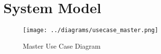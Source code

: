 \clearpage
\section{System Model}

\begin{figure}[H]
    \texttt{[image: ../diagrams/usecase\_master.png]}
	\caption{Master Use Case Diagram}
\end{figure}

